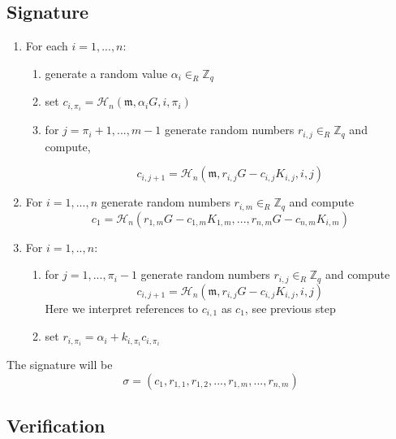 \subsection*{Signature}


\begin{enumerate}
	\item For each \(i = 1, ..., n \): \\
	\begin{enumerate}
		\item generate a random value \(\alpha_i \in_R \mathbb{Z}_q\)
		
		\item set \(c_{i, \pi_i} = \mathcal{H}_n(\mathfrak{m}, \alpha_i G, i, \pi_i)\)  
           
		
		\item for \(j = \pi_i + 1, ..., m-1 \) generate random numbers \(r_{i,j} \in_R \mathbb{Z}_q\) and compute,
         
         
		  \[c_{i, j+1} = \mathcal{H}_n(\mathfrak{m}, r_{i,j} G - c_{i, j} K_{i, j}, i, j)\]

	\end{enumerate}
	  
	 \item For \(i  = 1, ..., n \) generate random numbers \(r_{i, m} \in_R \mathbb{Z}_q\) and compute
	  \[c_1 = \mathcal{H}_n ( r_{1, m} G - c_{1,m} K_{1, m}, ..., r_{n, m} G - c_{n, m} K_{i, m}  )\]
	  
	 \item For \(i = 1, .., n \):
	 
	 \begin{enumerate}
	 	\item for \(j = 1, ..., \pi_i-1 \) generate random numbers \(r_{i, j} \in_R \mathbb{Z}_q\) and compute
 	\[c_{i, j+1} = \mathcal{H}_n (\mathfrak{m}, r_{i, j} G - c_{i, j} K_{i, j}, i, j)\]
 	  Here we interpret references to \(c_{i, 1}\) as \(c_1\), see previous step	
 	  
 	  
 	    \item set \(r_{i, \pi_i} = \alpha_i + k_{i, \pi_i} c_{i, \pi_{i}} \)
	 \end{enumerate} 
 
 
\end{enumerate}

The signature will be
 \[\sigma = (c_1, r_{1, 1}, r_{1, 2}, ..., r_{1, m}, ..., r_{n, m} )  \]


\subsection*{Verification}


